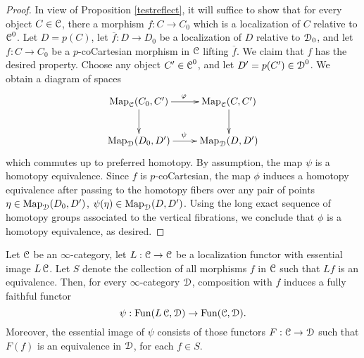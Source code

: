 \begin{proof}
In view of Proposition \ref{testreflect}, it will suffice to show that for every object $C \in \operatorname{\mathcal{C}}$, there
a morphism $f: C \rightarrow C_0$ which is a localization of $C$ relative to $\operatorname{\mathcal{C}}^{0}$. Let
$D = p(C)$, let $\overline{f}: D \rightarrow D_0$ be a localization of $D$ relative to $\operatorname{\mathcal{D}}_0$, and let
$f: C \rightarrow C_0$ be a $p$-coCartesian morphism in $\operatorname{\mathcal{C}}$ lifting $\overline{f}$. We claim that
$f$ has the desired property. Choose any object $C' \in \operatorname{\mathcal{C}}^{0}$, and let $D' = p(C') \in \operatorname{\mathcal{D}}^{0}$.
We obtain a diagram of spaces
$$ \xymatrix{ \bHom_{\calC}( C_0, C') \ar[r]^{\phi} \ar[d] &  \bHom_{\calC}(C, C') \ar[d] \\
\bHom_{\calD}( D_0, D') \ar[r]^{\psi} & \bHom_{\calD}( D, D') }$$
which commutes up to preferred homotopy. By assumption, the map $\psi$ is a homotopy equivalence. Since $f$ is $p$-coCartesian, the map $\phi$ induces a homotopy equivalence after passing to the homotopy fibers over any pair of points $\eta \in \operatorname{{Map}}_{\operatorname{\mathcal{D}}}(D_0, D')$, $\psi(\eta)
\in \operatorname{{Map}}_{\operatorname{\mathcal{D}}}(D,D')$. Using the long exact sequence of homotopy groups associated to the vertical fibrations, we conclude that $\phi$ is a homotopy equivalence, as desired.
\end{proof}

\begin{proposition}\label{unlap}
Let $\operatorname{\mathcal{C}}$ be an $\infty$-category, let $L: \operatorname{\mathcal{C}} \rightarrow \operatorname{\mathcal{C}}$ be a localization functor with essential image $L\operatorname{\mathcal{C}}$. Let $S$ denote the collection of all morphisms $f$ in $\operatorname{\mathcal{C}}$ such that $Lf$ is an equivalence. Then, for every $\infty$-category $\operatorname{\mathcal{D}}$, composition with
$f$ induces a fully faithful functor
$$ \psi: \operatorname{Fun}( L \operatorname{\mathcal{C}} , \operatorname{\mathcal{D}}) \rightarrow \operatorname{Fun}( \operatorname{\mathcal{C}}, \operatorname{\mathcal{D}}).$$
Moreover, the essential image of $\psi$ consists of those functors $F: \operatorname{\mathcal{C}} \rightarrow \operatorname{\mathcal{D}}$
such that $F(f)$ is an equivalence in $\operatorname{\mathcal{D}}$, for each $f \in S$.
\end{proposition}

